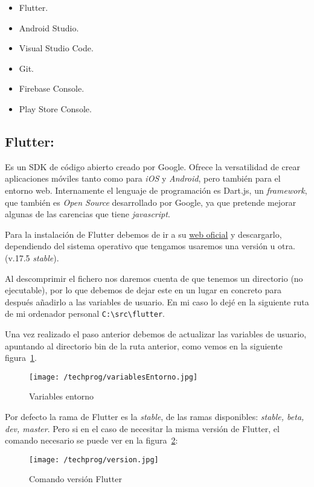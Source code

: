 \begin{itemize}
	\tightlist
	\item Flutter.
	\item Android Studio.
	\item Visual Studio Code.
	\item Git.
	\item Firebase Console.
	\item Play Store Console.
\end{itemize}

\subsection{Flutter:}
Es un SDK de código abierto creado por Google. Ofrece la versatilidad de crear aplicaciones móviles tanto como para \emph{iOS} y \emph{Android}, pero también para el entorno web. Internamente el lenguaje de programación es Dart.js, un \emph{framework}, que también es \emph{Open Source} desarrollado por Google, ya que pretende mejorar algunas de las carencias que tiene \emph{javascript}.

Para la instalación de Flutter debemos de ir a su \href{https://flutter.dev/docs/get-started/install}{web oficial} y descargarlo, dependiendo del sistema operativo que tengamos usaremos una versión u otra. (v.17.5 \emph{stable}).

Al descomprimir el fichero nos daremos cuenta de que tenemos un directorio (no ejecutable), por lo que debemos de dejar este en un lugar en concreto para después añadirlo a las variables de usuario. En mi caso lo dejé en la siguiente ruta de mi ordenador personal \verb|C:\src\flutter|.

Una vez realizado el paso anterior debemos de actualizar las variables de usuario, apuntando al directorio bin de la ruta anterior, como vemos en la siguiente figura~\ref{fig:entorno}.

\begin{figure}%
	\centering
	\texttt{[image: /techprog/variablesEntorno.jpg]}
	\caption{Variables entorno}
	\label{fig:entorno}
\end{figure}

Por defecto la rama de Flutter es la \emph{stable}, de las ramas disponibles: \emph{stable, beta, dev, master}. Pero si en el caso de necesitar la misma versión de Flutter, el comando necesario se puede ver en la figura~\ref{fig:comandoupdate}:

\begin{figure}%
	\centering
	\texttt{[image: /techprog/version.jpg]}
	\caption{Comando versión Flutter}
	\label{fig:comandoupdate}
\end{figure}


